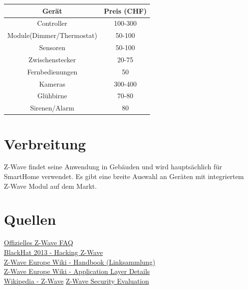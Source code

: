\documentclass[a4paper,11pt]{article}
\begin{document}
\begin{tabular}{| c | c |}
	\hline
	\textbf{Gerät} & Preis (CHF) \\\hline
	Controller & 100-300 \\\hline
	Module(Dimmer/Thermostat) & 50-100 \\\hline
	Sensoren & 50-100 \\\hline
	Zwischenstecker & 20-75 \\\hline
	Fernbedienungen & 50 \\\hline
	Kameras & 300-400 \\\hline
	Glühbirne & 70-80 \\\hline
	Sirenen/Alarm & 80 \\\hline
	
\end{tabular}

\section*{Verbreitung}
Z-Wave findet seine Anwendung in Gebäuden und wird hauptsächlich für SmartHome verwendet. Es gibt eine breite Auswahl an Geräten mit integriertem Z-Wave Modul auf dem Markt.

\section*{Quellen}

\href{http://www.z-wave.com/faq}{Offizielles Z-Wave FAQ}\\
\href{https://www.youtube.com/watch?v=KYaEQhvodc8}{BlackHat 2013 - Hacking Z-Wave}\\
\href{http://wiki.zwaveeurope.com/index.php?title=Z-Wave_Technical_Handbook}{Z-Wave Europe Wiki - Handbook (Linksammlung)}\\
\href{http://wiki.zwaveeurope.com/index.php?title=Z-Wave_Application_Layer}{Z-Wave Europe Wiki - Application Layer Details}\\
\href{https://en.wikipedia.org/wiki/Z-Wave}{Wikipedia - Z-Wave}
\href{https://www.sensepost.com/cms/resources/conferences/2013/bh_zwave/Security\%20Evaluation\%20of\%20Z-Wave_WP.pdf}{Z-Wave Security Evaluation}
\end{document}
